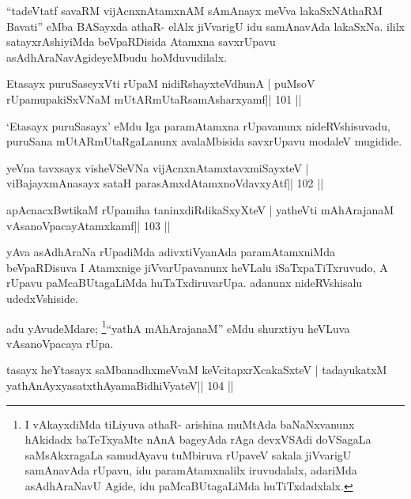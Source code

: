 \begin{artha}
``tadeVtatf savaRM vijAcnxnAtamxnAM sAmAnayx meVva lakaSxNAthaRM   Bavati'' eMba BASayxda athaR- elAlx jiVvarigU idu samAnavAda   lakaSxNa. ililx satayxrAshiyiMda beVpaRDisida Atamxna savxrUpavu   asAdhAraNavAgideyeMbudu hoMduvudilalx.
\end{artha}



\begin{shl}
Etasayx puruSaseyxVti rUpaM nidiRshayxteV\s dhunA |
puMsoV rUpamupakiSxVNaM mUtARmUtaRsamAsharxyamf\hfill || 101 ||
\end{shl}

\begin{artha}
`Etasayx puruSasayx' eMdu Iga paramAtamxna rUpavanunx nideRVshisuvadu,   puruSana mUtARmUtaRgaLanunx avalaMbisida savxrUpavu modaleV mugidide.
\end{artha}

\begin{shl}
yeVna tavxsayx visheVSeVNa vijAcnxnAtamxtavxmiSayxteV |
viBajayxmAnasayx sataH parasAmxdAtamxnoV\s davxyAtf\hfill || 102 ||
\end{shl}

\begin{shl}
apAcnacxBwtikaM rUpamiha taninxdiRdikaSxyXteV |
yatheVti mAhArajanaM vAsanoVpacayAtamxkamf\hfill || 103 ||
\end{shl}

\begin{artha}
yAva asAdhAraNa rUpadiMda adivxtiVyanAda paramAtamxniMda beVpaRDisuva
I Atamxnige jiVvarUpavanunx heVLalu iSaTxpaTiTxruvudo, A rUpavu
paMcaBUtagaLiMda huTaTxdiruvarUpa. adanunx nideRVshisalu udedxVshiside.
\end{artha}

\begin{artha}
adu yAvudeMdare; \footnote{I vAkayxdiMda tiLiyuva athaR- arishina
  muMtAda baNaNxvanunx hAkidadx baTeTxyaMte nAnA bageyAda rAga
  devxVSAdi doVSagaLa saMsAkxragaLa samudAyavu tuMbiruva
  rUpaveV sakala jiVvarigU samAnavAda rUpavu, idu paramAtamxnalilx
  iruvudalalx, adariMda asAdhAraNavU Agide, idu paMcaBUtagaLiMda 
  huTiTxdadxlalx.}``yathA mAhArajanaM'' eMdu shurxtiyu
heVLuva vAsanoVpacaya rUpa.
\end{artha}


\begin{shl}
tasayx heYtasayx saMbanadhxmeVvaM keVcitapxrXcakaSxteV |
tadayukatxM yathA\s nAyxyasatxthA\s yamaBidhiVyateV\hfill || 104 ||
\end{shl}


